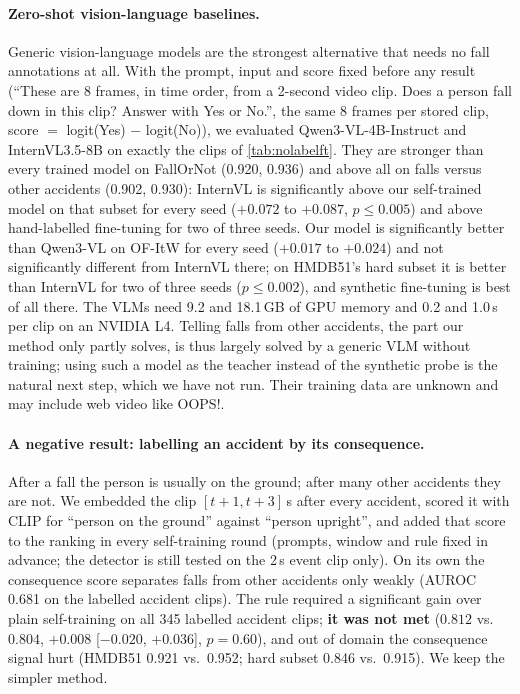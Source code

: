 \documentclass[10pt,twocolumn,letterpaper]{article}
\begin{document}
\paragraph{Zero-shot vision-language baselines.} Generic vision-language models are the strongest alternative that needs no fall annotations at all. With the prompt, input and score fixed before any result (``These are 8 frames, in time order, from a 2-second video clip. Does a person fall down in this clip? Answer with Yes or No.'', the same 8 frames per stored clip, score $=$ logit(Yes) $-$ logit(No)), we evaluated Qwen3-VL-4B-Instruct and InternVL3.5-8B on exactly the clips of \cref{tab:nolabelft}. They are stronger than every trained model on FallOrNot (0.920, 0.936) and above all on falls versus other accidents (0.902, 0.930): InternVL is significantly above our self-trained model on that subset for every seed ($+0.072$ to $+0.087$, $p\le0.005$) and above hand-labelled fine-tuning for two of three seeds. Our model is significantly better than Qwen3-VL on OF-ItW for every seed ($+0.017$ to $+0.024$) and not significantly different from InternVL there; on HMDB51's hard subset it is better than InternVL for two of three seeds ($p\le0.002$), and synthetic fine-tuning is best of all there. The VLMs need 9.2 and 18.1\,GB of GPU memory and 0.2 and 1.0\,s per clip on an NVIDIA L4. Telling falls from other accidents, the part our method only partly solves, is thus largely solved by a generic VLM without training; using such a model as the teacher instead of the synthetic probe is the natural next step, which we have not run. Their training data are unknown and may include web video like OOPS!.

\paragraph{A negative result: labelling an accident by its consequence.} After a fall the person is usually on the ground; after many other accidents they are not. We embedded the clip $[t+1, t+3]$\,s after every accident, scored it with CLIP for ``person on the ground'' against ``person upright'', and added that score to the ranking in every self-training round (prompts, window and rule fixed in advance; the detector is still tested on the 2\,s event clip only). On its own the consequence score separates falls from other accidents only weakly (AUROC 0.681 on the labelled accident clips). The rule required a significant gain over plain self-training on all 345 labelled accident clips; \textbf{it was not met} ($0.812$ vs.\ $0.804$, $+0.008$ [$-0.020$, $+0.036$], $p=0.60$), and out of domain the consequence signal hurt (HMDB51 0.921 vs.\ 0.952; hard subset 0.846 vs.\ 0.915). We keep the simpler method.
\end{document}
